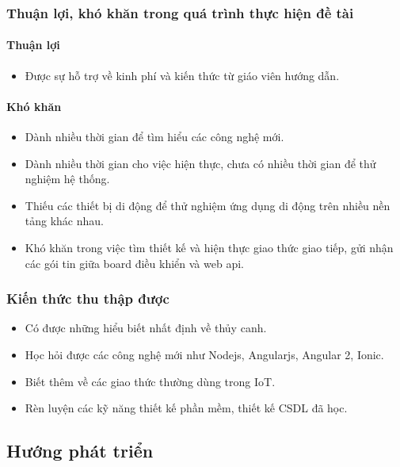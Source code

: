 \documentclass[a4paper,12pt,oneside]{article}
\begin{document}
	\subsubsection{Thuận lợi, khó khăn trong quá trình thực hiện đề tài}	
	\paragraph{Thuận lợi}
		\begin{itemize}
		\item Được sự hỗ trợ về kinh phí và kiến thức từ giáo viên hướng dẫn. 
		\end{itemize}
	\paragraph{Khó khăn}
		\begin{itemize}
		\item Dành nhiều thời gian để tìm hiểu các công nghệ mới. 

		\item Dành nhiều thời gian cho việc hiện thực, chưa có nhiều thời gian để thử nghiệm hệ thống. 

		\item Thiếu các thiết bị di động để thử nghiệm ứng dụng di động trên nhiều nền tảng khác nhau. 

		\item  Khó khăn trong việc tìm thiết kế và hiện thực giao thức giao tiếp, gửi nhận các gói tin giữa board điều khiển và web api. 
		\end{itemize}

\subsubsection{Kiến thức thu thập được}
\begin{itemize}
\item Có được những hiểu biết nhất định về thủy canh. 

\item Học hỏi được các công nghệ mới như Nodejs, Angularjs, Angular 2, Ionic. 

\item Biết thêm về các giao thức thường dùng trong IoT. 

\item Rèn luyện các kỹ năng thiết kế phần mềm, thiết kế CSDL đã học. 
\end{itemize}

	
\subsection{Hướng phát triển}
\end{document}
